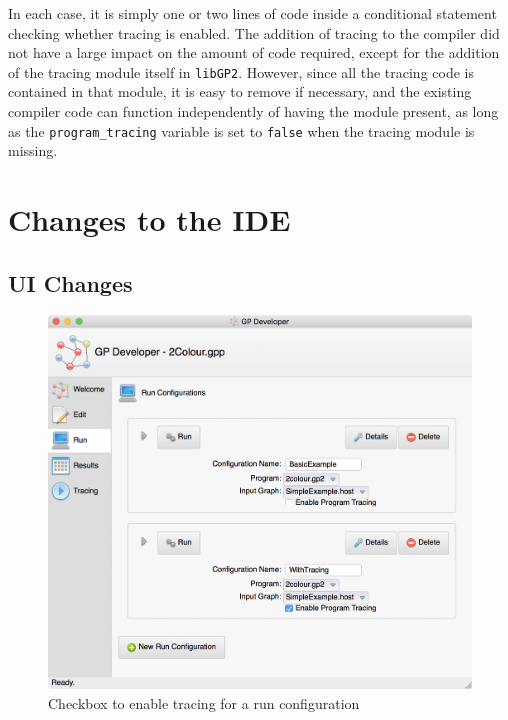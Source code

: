 \documentclass[authoryearcitations]{UoYCSproject}
\newenvironment{nscenter}
    {\parskip=0pt\par\nopagebreak\centering}
    {\par\noindent\ignorespacesafterend}
\begin{document}
In each case, it is simply one or two lines of code inside a conditional
statement checking whether tracing is enabled. The addition of tracing to the
compiler did not have a large impact on the amount of code required, except for
the addition of the tracing module itself in \texttt{libGP2}. However, since all
the tracing code is contained in that module, it is easy to remove if necessary,
and the existing compiler code can function independently of having the module
present, as long as the \texttt{program\_tracing} variable is set to \texttt{false}
when the tracing module is missing.


\section{Changes to the IDE}
\label{sec:ChangesToTheIDE}

\subsection{UI Changes}
\label{sec:UIChanges}

\begin{figure}[!htb]
    \begin{nscenter}
        \includegraphics[width=\textwidth]{TracingCheckbox}
    \end{nscenter}
    \caption{Checkbox to enable tracing for a run configuration}
    \label{fig:TracingCheckbox}
\end{figure}
\end{document}
